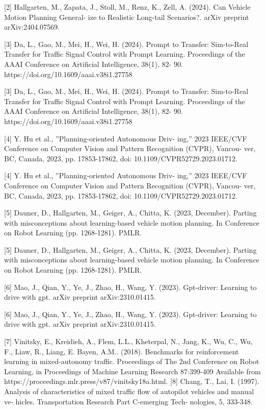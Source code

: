 \documentclass[12pt]{article}
\begin{document}
[2] Hallgarten, M., Zapata, J., Stoll, M., Renz, K., Zell,
A. (2024). Can Vehicle Motion Planning General-
ize to Realistic Long-tail Scenarios?. arXiv preprint
arXiv:2404.07569.


[3] Da, L., Gao, M., Mei, H., Wei, H. (2024). Prompt
to Transfer: Sim-to-Real Transfer for Traffic Signal
Control with Prompt Learning. Proceedings of the
AAAI Conference on Artificial Intelligence, 38(1), 82-
90. https://doi.org/10.1609/aaai.v38i1.27758


[3] Da, L., Gao, M., Mei, H., Wei, H. (2024). Prompt
to Transfer: Sim-to-Real Transfer for Traffic Signal
Control with Prompt Learning. Proceedings of the
AAAI Conference on Artificial Intelligence, 38(1), 82-
90. https://doi.org/10.1609/aaai.v38i1.27758


[4] Y. Hu et al., ”Planning-oriented Autonomous Driv-
ing,” 2023 IEEE/CVF Conference on Computer
Vision and Pattern Recognition (CVPR), Vancou-
ver, BC, Canada,
2023, pp. 17853-17862, doi:
10.1109/CVPR52729.2023.01712.


[4] Y. Hu et al., ”Planning-oriented Autonomous Driv-
ing,” 2023 IEEE/CVF Conference on Computer
Vision and Pattern Recognition (CVPR), Vancou-
ver, BC, Canada,
2023, pp. 17853-17862, doi:
10.1109/CVPR52729.2023.01712.


[5] Dauner, D., Hallgarten, M., Geiger, A., Chitta, K.
(2023, December). Parting with misconceptions about
learning-based vehicle motion planning. In Conference
on Robot Learning (pp. 1268-1281). PMLR.


[5] Dauner, D., Hallgarten, M., Geiger, A., Chitta, K.
(2023, December). Parting with misconceptions about
learning-based vehicle motion planning. In Conference
on Robot Learning (pp. 1268-1281). PMLR.


[6] Mao, J., Qian, Y., Ye, J., Zhao, H., Wang, Y. (2023).
Gpt-driver: Learning to drive with gpt. arXiv preprint
arXiv:2310.01415.


[6] Mao, J., Qian, Y., Ye, J., Zhao, H., Wang, Y. (2023).
Gpt-driver: Learning to drive with gpt. arXiv preprint
arXiv:2310.01415.


[7] Vinitsky, E., Kreidieh, A., Flem, L.L., Kheterpal,
N., Jang, K., Wu, C., Wu, F., Liaw, R., Liang, E.
Bayen, A.M.. (2018). Benchmarks for reinforcement
learning in mixed-autonomy traffic. Proceedings of The
2nd Conference on Robot Learning, in Proceedings of
Machine Learning Research 87:399-409 Available from
https://proceedings.mlr.press/v87/vinitsky18a.html.
[8] Chang, T., Lai, I. (1997). Analysis of characteristics of
mixed traffic flow of autopilot vehicles and manual ve-
hicles. Transportation Research Part C-emerging Tech-
nologies, 5, 333-348.
\end{document}
